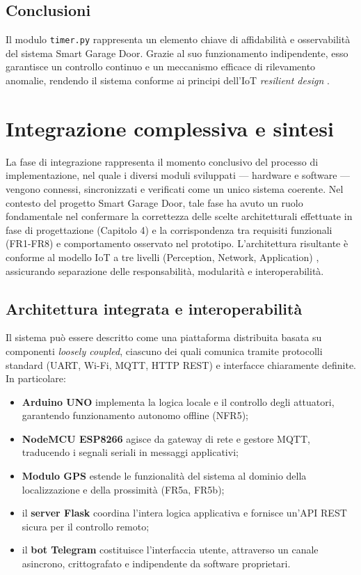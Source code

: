 \subsection*{Conclusioni}
Il modulo \texttt{timer.py} rappresenta un elemento chiave di affidabilità e osservabilità del sistema Smart Garage Door. Grazie al suo funzionamento indipendente, esso garantisce un controllo continuo e un meccanismo efficace di rilevamento anomalie, rendendo il sistema conforme ai principi dell'IoT \textit{resilient design} \cite{Tang2022}.

\section{Integrazione complessiva e sintesi}
La fase di integrazione rappresenta il momento conclusivo del processo di implementazione, nel quale i diversi moduli sviluppati — hardware e software — vengono connessi, sincronizzati e verificati come un unico sistema coerente. Nel contesto del progetto Smart Garage Door, tale fase ha avuto un ruolo fondamentale nel confermare la correttezza delle scelte architetturali effettuate in fase di progettazione (Capitolo 4) e la corrispondenza tra requisiti funzionali (FR1-FR8) e comportamento osservato nel prototipo.
L'architettura risultante è conforme al modello IoT a tre livelli (Perception, Network, Application) \cite{Gubbi2013}, assicurando separazione delle responsabilità, modularità e interoperabilità.

\subsection*{Architettura integrata e interoperabilità}
Il sistema può essere descritto come una piattaforma distribuita basata su componenti \textit{loosely coupled}, ciascuno dei quali comunica tramite protocolli standard (UART, Wi-Fi, MQTT, HTTP REST) e interfacce chiaramente definite. In particolare:
\begin{itemize}
    \item \textbf{Arduino UNO} implementa la logica locale e il controllo degli attuatori, garantendo funzionamento autonomo offline (NFR5);
    \item \textbf{NodeMCU ESP8266} agisce da gateway di rete e gestore MQTT, traducendo i segnali seriali in messaggi applicativi;
    \item \textbf{Modulo GPS} estende le funzionalità del sistema al dominio della localizzazione e della prossimità (FR5a, FR5b);
    \item il \textbf{server Flask} coordina l'intera logica applicativa e fornisce un'API REST sicura per il controllo remoto;
    \item il \textbf{bot Telegram} costituisce l'interfaccia utente, attraverso un canale asincrono, crittografato e indipendente da software proprietari.
\end{itemize}

